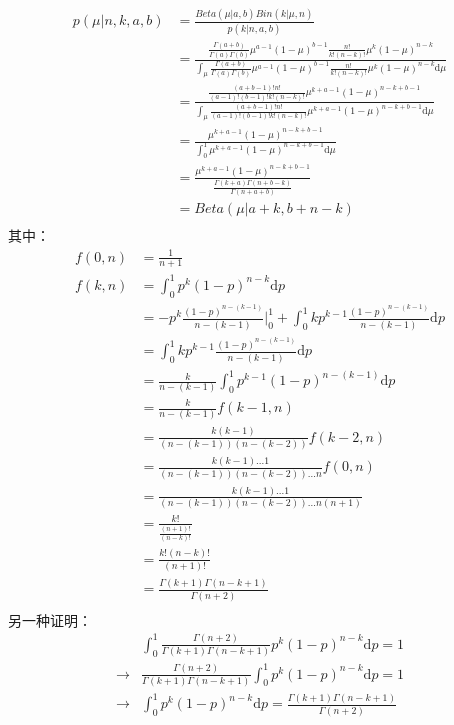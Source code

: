 \begin{displaymath}
\begin{split}
p(\mu|n,k,a,b) &=\frac{Beta(\mu|a,b)Bin(k|\mu,n)}{p(k|n,a,b)}\\
&=\frac{
 \frac{\Gamma(a+b)}{\Gamma(a)\Gamma(b)} \mu^{a-1} (1-\mu)^{b-1} \frac{n!}{k!(n-k)!} \mu^k(1-\mu)^{n-k}
}{
\int_\mu \frac{\Gamma(a+b)}{\Gamma(a)\Gamma(b)} \mu^{a-1} (1-\mu)^{b-1} \frac{n!}{k!(n-k)!} \mu^k(1-\mu)^{n-k} \mathrm{d} \mu
} \\
&= \frac{
 \frac{(a+b-1)! n!}{(a-1)!(b-1)!k!(n-k)!} \mu^{k+a-1} (1-\mu)^{n-k+b-1}
}{
\int_\mu  \frac{(a+b-1)! n!}{(a-1)!(b-1)!k!(n-k)!} \mu^{k+a-1} (1-\mu)^{n-k+b-1} \mathrm{d} \mu
}\\
&= \frac{
 \mu^{k+a-1} (1-\mu)^{n-k+b-1}
}{
\int_0^1 \mu^{k+a-1} (1-\mu)^{n-k+b-1} \mathrm{d} \mu
}\\
&= \frac{
 \mu^{k+a-1} (1-\mu)^{n-k+b-1}
}{
\frac{\Gamma{(k+a)}\Gamma{(n+b-k)}}{\Gamma{(n+a+b)}}
}\\
&= Beta(\mu|a+k, b+n-k)\\
\end{split}
\end{displaymath}
其中：
\begin{displaymath}
\begin{split}
f(0,n) &= \frac{1}{n+1}\\
f(k,n) &= \int_0^1 p^{k}(1-p)^{n-k} \mathrm{d} p\\
&= -p^{k}\frac{(1-p)^{n-(k-1)}}{n-(k-1)} \Bigg |_0^1 + \int_0^1 kp^{k-1} \frac{(1-p)^{n-(k-1)}}{n-(k-1)} \mathrm{d} p\\
& =\int_0^1 kp^{k-1} \frac{(1-p)^{n-(k-1)}}{n-(k-1)} \mathrm{d} p\\
&= \frac{k}{n-(k-1)} \int_0^1 p^{k-1} {(1-p)^{n-(k-1)}} \mathrm{d} p\\
&= \frac{k}{n-(k-1)} f(k-1,n)\\
&= \frac{k(k-1)}{(n-(k-1))(n-(k-2))} f(k-2,n)\\
&= \frac{k(k-1)...1}{(n-(k-1))(n-(k-2))...n} f(0,n)\\
&= \frac{k(k-1)...1}{(n-(k-1))(n-(k-2))...n(n+1)}\\
&= \frac{k!}{\frac{(n+1)!}{(n-k)!}}\\
&= \frac{k!(n-k)!}{(n+1)!}\\
&= \frac{\Gamma(k+1)\Gamma(n-k+1)} {\Gamma(n+2)}\\
\end{split}
\end{displaymath}
另一种证明：
\begin{displaymath}
\begin{split}
&\int_0^1 \frac{\Gamma(n+2)}{\Gamma(k+1)\Gamma(n-k+1)} p^{k}(1-p)^{n-k} \mathrm{d} p = 1\\
\to & \frac{\Gamma(n+2)}{\Gamma(k+1)\Gamma(n-k+1)}  \int_0^1  p^{k}(1-p)^{n-k} \mathrm{d} p = 1\\
\to & \int_0^1  p^{k}(1-p)^{n-k} \mathrm{d} p =  \frac{\Gamma(k+1)\Gamma(n-k+1)} {\Gamma(n+2)} \\
\end{split}
\end{displaymath}
